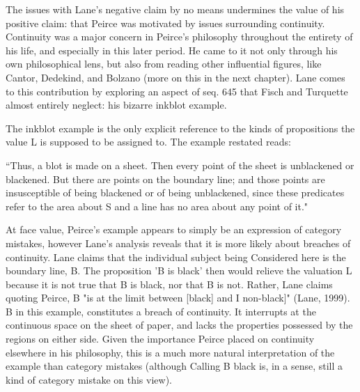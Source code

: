\documentclass[12pt]{article}
\begin{document}
 The issues with Lane's negative claim by no means undermines the value of his positive claim: that Peirce was motivated by issues surrounding continuity. Continuity was a major concern in Peirce's philosophy throughout the entirety of his life, and especially in this later period. He came to it not only through his own philosophical lens, but also from reading other influential figures, like Cantor,  Dedekind, and Bolzano (more on this in the next chapter). Lane comes to this contribution by exploring an aspect of seq. 645 that Fisch and Turquette almost entirely neglect: his bizarre inkblot example.
 
 The inkblot example is the only explicit reference to the kinds of propositions the value L is supposed to be assigned to. The example restated reads: 
\begin{singlespace}
``Thus, a blot is made on a sheet. Then every point of the sheet is unblackened or blackened. But there are points on the boundary line; and those points are insusceptible of being blackened or of being unblackened, since these predicates refer to the area about S and a line has no area about any point of it."
\end{singlespace}
\noindent At face value, Peirce's example appears to simply be an expression of category mistakes, however Lane's analysis reveals that it is more likely about breaches of continuity. Lane claims that the individual subject being Considered here is the boundary line, B. The proposition 'B is black' then would relieve the valuation L because it is not true that B is black, nor that B is not. Rather, Lane claims quoting Peirce, B "is at the limit between [black] and I non-black]" (Lane, 1999). B in this example, constitutes a breach of continuity. It interrupts at the continuous space on the sheet of paper, and lacks the properties possessed by the regions on either side. Given the importance Peirce placed on continuity elsewhere in his philosophy, this is a much more natural interpretation of the example than category mistakes (although Calling B black is, in a sense, still a kind of category mistake on this view).
 
\end{document}

